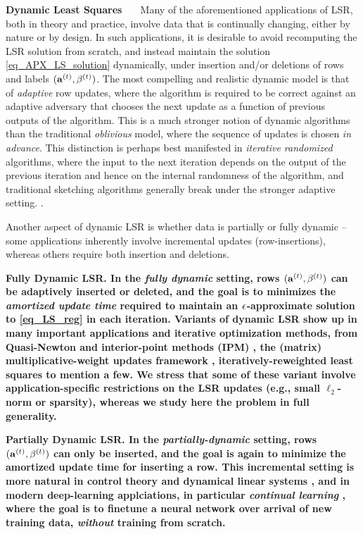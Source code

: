 \vspace{+2mm}
{\bf \noindent  Dynamic Least Squares \ \ } 
Many of the aforementioned applications of LSR, both in theory and practice, involve data that is continually changing, either by nature or by design. In such  applications, it is desirable to avoid recomputing the LSR solution from scratch, and instead maintain the solution \eqref{eq_APX_LS_solution} dynamically, under insertion and/or deletions of rows and labels $(\mathbf{a}^{(t)}, \beta^{(t)})$. 
The most compelling and realistic dynamic model is that of \emph{adaptive} row updates, where the algorithm  is required to be correct  against an adaptive adversary that chooses the next update as a function of previous outputs of the algorithm. This is a much stronger notion of  dynamic algorithms than the traditional \emph{oblivious} model, where the sequence of updates is chosen \emph{in advance}. 
This distinction is perhaps best manifested in 
\emph{iterative randomized} algorithms, where the input to the next iteration depends on the output of the previous iteration and hence on the internal randomness of the algorithm, and traditional sketching algorithms generally break under the stronger adaptive setting. \cite{hw13, bjwy22, hkm+22,cohen2022robustness}. 

Another aspect of dynamic LSR  is whether data is partially or fully dynamic -- some applications inherently involve incremental updates (row-insertions), whereas others require both insertion and deletions. 

\bf Fully Dynamic LSR. \rm 
In the \emph{fully dynamic} setting, rows $(\mathbf{a}^{(t)}, \beta^{(t)})$ can be adaptively inserted or deleted, and the goal is to minimizes the \emph{amortized update time} required to maintain an $\epsilon$-approximate solution to \eqref{eq_LS_reg} in each iteration. 
Variants of dynamic LSR show up in many important applications and iterative optimization methods, from 
Quasi-Newton \cite{pilanci2017newton} and interior-point methods (IPM) \cite{cls21}, 
the (matrix) multiplicative-weight updates framework \cite{AHK06}, iteratively-reweighted least squares \cite{Law61} to mention a few.   
We stress that some of these variant involve application-specific restrictions on the LSR updates (e.g., small $\ell_2$-norm or sparsity), whereas we study here the problem in full generality. 

\bf Partially Dynamic LSR. \rm \; 
In the \emph{partially-dynamic} setting, rows $(\mathbf{a}^{(t)}, \beta^{(t)})$ can only be inserted, and the goal is again to minimize the amortized update time for inserting a row.
This incremental setting is more natural in 
 control theory and dynamical linear systems \cite{Pla50, k60}, and in modern deep-learning applciations, in particular \emph{continual learning} \cite{pkp+19,cpp22}, where the 
goal is to finetune a neural network over arrival of new training data, \emph{without} training from scratch. 

